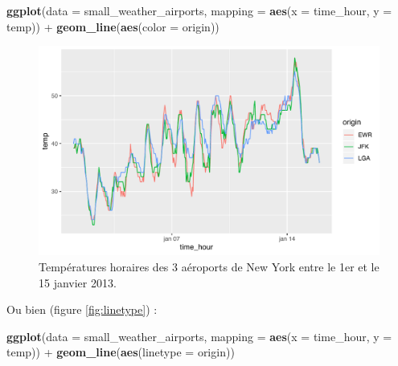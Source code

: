 \documentclass[
  a4paper,
]{article}
\newenvironment{Shaded}{\begin{snugshade}}{\end{snugshade}}
\newcommand{\DataTypeTok}[1]{\textcolor[rgb]{0.00,0.34,0.68}{#1}}
\newcommand{\KeywordTok}[1]{\textcolor[rgb]{0.12,0.11,0.11}{\textbf{#1}}}
\newcommand{\NormalTok}[1]{\textcolor[rgb]{0.12,0.11,0.11}{#1}}
\newcommand{\OperatorTok}[1]{\textcolor[rgb]{0.12,0.11,0.11}{#1}}
\newcommand{\StringTok}[1]{\textcolor[rgb]{0.75,0.01,0.01}{#1}}
\begin{document}
\begin{Shaded}
\begin{Highlighting}[]
\KeywordTok{ggplot}\NormalTok{(}\DataTypeTok{data =}\NormalTok{ small_weather_airports, }
       \DataTypeTok{mapping =} \KeywordTok{aes}\NormalTok{(}\DataTypeTok{x =}\NormalTok{ time_hour, }\DataTypeTok{y =}\NormalTok{ temp)) }\OperatorTok{+}
\StringTok{  }\KeywordTok{geom_line}\NormalTok{(}\KeywordTok{aes}\NormalTok{(}\DataTypeTok{color =}\NormalTok{ origin))}
\end{Highlighting}
\end{Shaded}

\begin{figure}[htpb]

{\centering \includegraphics[width=0.9\linewidth]{figure/linecolor-1} 

}

\caption{Températures horaires des 3 aéroports de New York entre le 1er et le 15 janvier 2013.}\label{fig:linecolor}
\end{figure}

Ou bien (figure \ref{fig:linetype}) :

\begin{Shaded}
\begin{Highlighting}[]
\KeywordTok{ggplot}\NormalTok{(}\DataTypeTok{data =}\NormalTok{ small_weather_airports, }
       \DataTypeTok{mapping =} \KeywordTok{aes}\NormalTok{(}\DataTypeTok{x =}\NormalTok{ time_hour, }\DataTypeTok{y =}\NormalTok{ temp)) }\OperatorTok{+}
\StringTok{  }\KeywordTok{geom_line}\NormalTok{(}\KeywordTok{aes}\NormalTok{(}\DataTypeTok{linetype =}\NormalTok{ origin))}
\end{Highlighting}
\end{Shaded}
\end{document}
